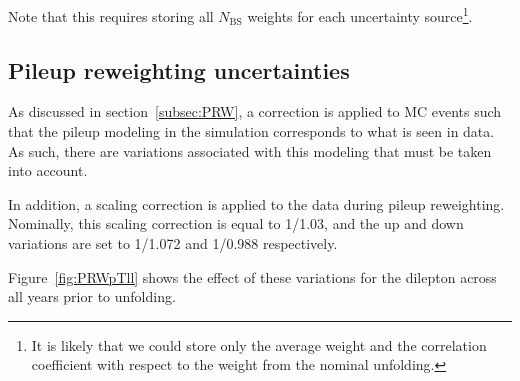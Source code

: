 Note that this requires storing all $N_\mathrm{BS}$ weights for each uncertainty source\footnote{It is likely that we could store only the average weight and the correlation coefficient with respect to the weight from the nominal unfolding.}.


\subsection{Pileup reweighting uncertainties}
As discussed in section~\ref{subsec:PRW}, a correction is applied to MC events such that the pileup modeling in the simulation corresponds to what is seen in data. As such, there are variations associated with this modeling
that must be taken into account.

In addition, a scaling correction is applied to the data during pileup reweighting. Nominally, this scaling correction is equal to 1/1.03, and the up and down variations are set to 1/1.072 and 1/0.988 respectively.

Figure~\ref{fig:PRWpTll} shows the effect of these variations for the dilepton \pt across all years prior to unfolding.

